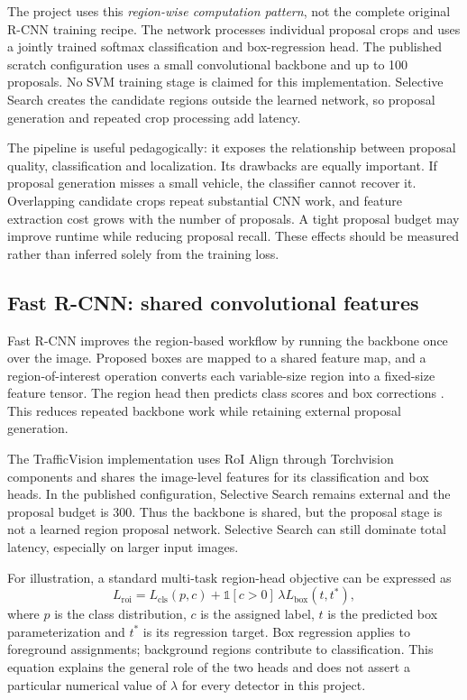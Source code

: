 The project uses this \emph{region-wise computation pattern}, not the complete original R-CNN training recipe. The network processes individual proposal crops and uses a jointly trained softmax classification and box-regression head. The published scratch configuration uses a small convolutional backbone and up to 100 proposals. No SVM training stage is claimed for this implementation. Selective Search creates the candidate regions outside the learned network, so proposal generation and repeated crop processing add latency.

The pipeline is useful pedagogically: it exposes the relationship between proposal quality, classification and localization. Its drawbacks are equally important. If proposal generation misses a small vehicle, the classifier cannot recover it. Overlapping candidate crops repeat substantial CNN work, and feature extraction cost grows with the number of proposals. A tight proposal budget may improve runtime while reducing proposal recall. These effects should be measured rather than inferred solely from the training loss.

\subsection{Fast R-CNN: shared convolutional features}
Fast R-CNN improves the region-based workflow by running the backbone once over the image. Proposed boxes are mapped to a shared feature map, and a region-of-interest operation converts each variable-size region into a fixed-size feature tensor. The region head then predicts class scores and box corrections \cite{fast}. This reduces repeated backbone work while retaining external proposal generation.

The TrafficVision implementation uses RoI Align through Torchvision components and shares the image-level features for its classification and box heads. In the published configuration, Selective Search remains external and the proposal budget is 300. Thus the backbone is shared, but the proposal stage is not a learned region proposal network. Selective Search can still dominate total latency, especially on larger input images.

For illustration, a standard multi-task region-head objective can be expressed as
\begin{equation}
L_{\mathrm{roi}}=L_{\mathrm{cls}}(p,c)+\mathbb{1}[c>0]\,\lambda L_{\mathrm{box}}(t,t^*),
\end{equation}
where $p$ is the class distribution, $c$ is the assigned label, $t$ is the predicted box parameterization and $t^*$ is its regression target. Box regression applies to foreground assignments; background regions contribute to classification. This equation explains the general role of the two heads and does not assert a particular numerical value of $\lambda$ for every detector in this project.

